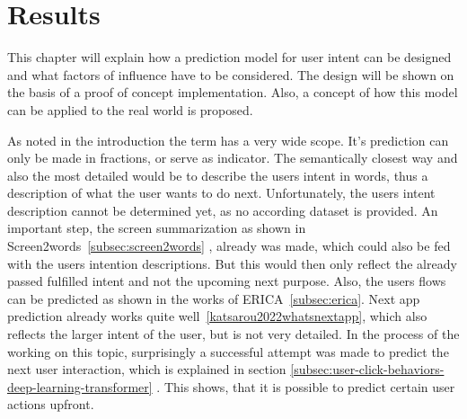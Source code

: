 \chapter{Results}
\label{ch:results}

%

This chapter will explain how a prediction model for user intent can be designed and what factors of influence have to be considered.
The design will be shown on the basis of a proof of concept implementation.
Also, a concept of how this model can be applied to the real world is proposed. 

As noted in the introduction the term  has a very wide scope.
It's prediction can only be made in fractions, or serve as indicator.
The semantically closest way and also the most detailed would be to describe the users intent in words, thus a description of what the user wants to do next.
Unfortunately, the users intent description cannot be determined yet, as no according dataset is provided.
An important step, the screen summarization as shown in Screen2words~\ref{subsec:screen2words} \cite{wang2021screen2words}, already was made, which could also be fed with the users intention descriptions.
But this would then only reflect the already passed fulfilled intent and not the upcoming next purpose.
Also, the users flows can be predicted as shown in the works of ERICA~\ref{subsec:erica}.
Next app prediction already works quite well~\ref{katsarou2022whatsnextapp}, which also reflects the larger intent of the user, but is not very detailed.
In the process of the working on this topic, surprisingly a successful attempt was made to predict the next user interaction, which is explained in section \ref{subsec:user-click-behaviors-deep-learning-transformer} \cite{zhou2021large}.
This shows, that it is possible to predict certain user actions upfront.

